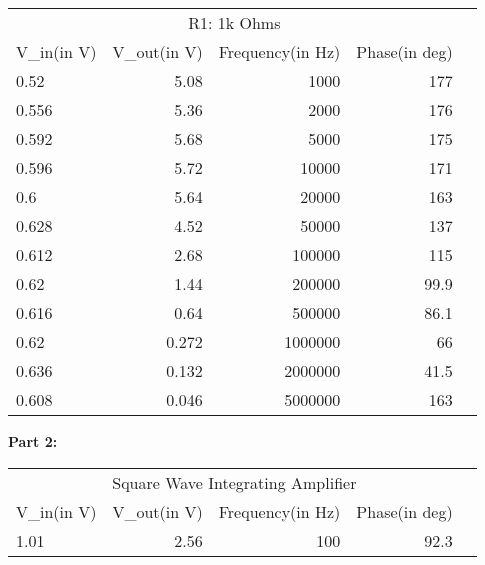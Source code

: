 \begin{table}[!htp]\centering
    \scriptsize
    \begin{tabular}{lrrrr}\toprule
        \multicolumn{4}{c}{R1: 1k Ohms}                               \\\cmidrule{1-4}
        V\_in(in V) & V\_out(in V) & Frequency(in Hz) & Phase(in deg) \\\midrule
        0.52        & 5.08         & 1000             & 177           \\
        0.556       & 5.36         & 2000             & 176           \\
        0.592       & 5.68         & 5000             & 175           \\
        0.596       & 5.72         & 10000            & 171           \\
        0.6         & 5.64         & 20000            & 163           \\
        0.628       & 4.52         & 50000            & 137           \\
        0.612       & 2.68         & 100000           & 115           \\
        0.62        & 1.44         & 200000           & 99.9          \\
        0.616       & 0.64         & 500000           & 86.1          \\
        0.62        & 0.272        & 1000000          & 66            \\
        0.636       & 0.132        & 2000000          & 41.5          \\
        0.608       & 0.046        & 5000000          & 163           \\
        \bottomrule
    \end{tabular}
\end{table}

\break
{\large \textbf{Part 2:}}


\begin{table}[!htp]\centering
    \scriptsize
    \begin{tabular}{lrrrr}\toprule
        \multicolumn{4}{c}{Square Wave Integrating Amplifier}         \\\cmidrule{1-4}
        V\_in(in V) & V\_out(in V) & Frequency(in Hz) & Phase(in deg) \\\midrule
        1.01        & 2.56         & 100              & 92.3          \\
        \bottomrule
    \end{tabular}
\end{table}


